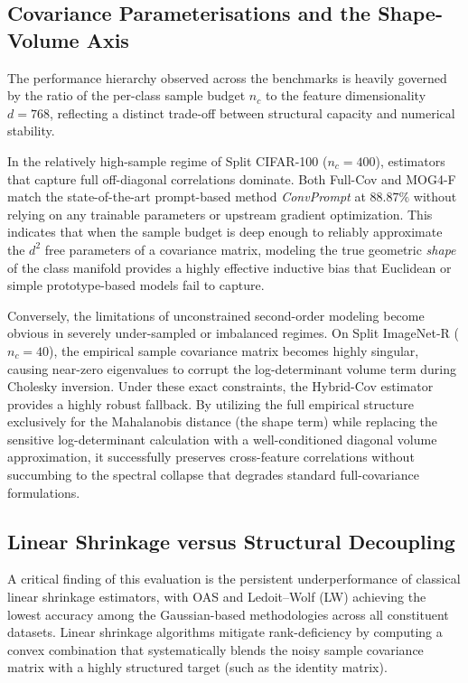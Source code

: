 \subsection{Covariance Parameterisations and the Shape-Volume Axis}
\label{sec:an:covariance_mechanics}

The performance hierarchy observed across the benchmarks is heavily governed by the ratio of the per-class sample budget $n_c$ to the feature dimensionality $d=768$, reflecting a distinct trade-off between structural capacity and numerical stability.

In the relatively high-sample regime of Split CIFAR-100 ($n_c = 400$), estimators that capture full off-diagonal correlations dominate. Both Full-Cov and MOG4-F match the state-of-the-art prompt-based method \textit{ConvPrompt} at $88.87\%$ without relying on any trainable parameters or upstream gradient optimization. This indicates that when the sample budget is deep enough to reliably approximate the $d^2$ free parameters of a covariance matrix, modeling the true geometric \emph{shape} of the class manifold provides a highly effective inductive bias that Euclidean or simple prototype-based models fail to capture.

Conversely, the limitations of unconstrained second-order modeling become obvious in severely under-sampled or imbalanced regimes. On Split ImageNet-R ($n_c = 40$), the empirical sample covariance matrix becomes highly singular, causing near-zero eigenvalues to corrupt the log-determinant volume term during Cholesky inversion. Under these exact constraints, the Hybrid-Cov estimator provides a highly robust fallback. By utilizing the full empirical structure exclusively for the Mahalanobis distance (the shape term) while replacing the sensitive log-determinant calculation with a well-conditioned diagonal volume approximation, it successfully preserves cross-feature correlations without succumbing to the spectral collapse that degrades standard full-covariance formulations.

\subsection{Linear Shrinkage versus Structural Decoupling}
\label{sec:an:shrinkage}

A critical finding of this evaluation is the persistent underperformance of classical linear shrinkage estimators, with OAS and Ledoit--Wolf (LW) achieving the lowest accuracy among the Gaussian-based methodologies across all constituent datasets. Linear shrinkage algorithms mitigate rank-deficiency by computing a convex combination that systematically blends the noisy sample covariance matrix with a highly structured target (such as the identity matrix).

